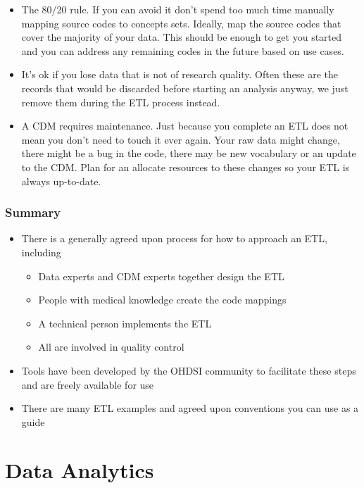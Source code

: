 \documentclass[11pt]{book}
\providecommand{\tightlist}{%
  \setlength{\itemsep}{0pt}\setlength{\parskip}{0pt}}
\theoremstyle{definition}
\theoremstyle{definition}
\theoremstyle{definition}
\theoremstyle{remark}
\let\BeginKnitrBlock\begin \let\EndKnitrBlock\end
\begin{document}
\begin{itemize}
\tightlist
\item
  The 80/20 rule. If you can avoid it don't spend too much time manually mapping source codes to concepts sets. Ideally, map the source codes that cover the majority of your data. This should be enough to get you started and you can address any remaining codes in the future based on use cases.
\item
  It's ok if you lose data that is not of research quality. Often these are the records that would be discarded before starting an analysis anyway, we just remove them during the ETL process instead.
\item
  A CDM requires maintenance. Just because you complete an ETL does not mean you don't need to touch it ever again. Your raw data might change, there might be a bug in the code, there may be new vocabulary or an update to the CDM. Plan for an allocate resources to these changes so your ETL is always up-to-date.
\end{itemize}

\hypertarget{summary-3}{%
\section{Summary}\label{summary-3}}

\BeginKnitrBlock{rmdsummary}
\begin{itemize}
\item
  There is a generally agreed upon process for how to approach an ETL, including

  \begin{itemize}
  \tightlist
  \item
    Data experts and CDM experts together design the ETL
  \item
    People with medical knowledge create the code mappings
  \item
    A technical person implements the ETL
  \item
    All are involved in quality control
  \end{itemize}
\item
  Tools have been developed by the OHDSI community to facilitate these steps and are freely available for use
\item
  There are many ETL examples and agreed upon conventions you can use as a guide
\end{itemize}
\EndKnitrBlock{rmdsummary}

\hypertarget{part-data-analytics}{%
\part{Data Analytics}\label{part-data-analytics}}
\end{document}
